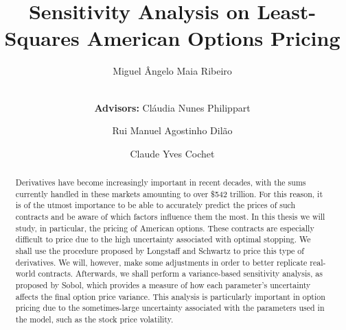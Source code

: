 \documentclass[a4paper,twocolumn,aps,prd,longbibliography,superscriptaddress]{revtex4-1}
\begin{document}
\title{Sensitivity Analysis on Least-Squares American Options Pricing}

\author{Miguel Ângelo Maia Ribeiro}

\author{\\[0.3cm]\small{\textbf{Advisors:} Cláudia Nunes Philippart}}
\author{\small{Rui Manuel Agostinho Dilão}}
\author{\small{Claude Yves Cochet}}


\begin{abstract}
Derivatives have become increasingly important in recent decades, with the sums currently handled in these markets amounting to over \$542 trillion.
For this reason, it is of the utmost importance to be able to accurately predict the prices of such contracts and be aware of which factors influence them the most.
In this thesis we will study, in particular, the pricing of American options. These contracts are especially difficult to price due to the high uncertainty associated with optimal stopping.
We shall use the procedure proposed by Longstaff and Schwartz to price this type of derivatives. We will, however, make some adjustments in order to better replicate real-world contracts.
Afterwards, we shall perform a variance-based sensitivity analysis, as proposed by Sobol, which provides a measure of how each parameter's uncertainty affects the final option price variance.
This analysis is particularly important in option pricing due to the sometimes-large uncertainty associated with the parameters used in the model, such as the stock price volatility.
\end{abstract}

\maketitle
\end{document}
